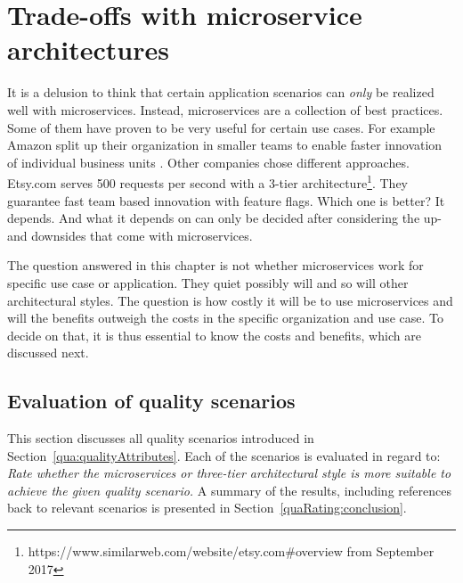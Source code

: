 \chapter{Trade-offs with microservice architectures}
\label{qua:qualitiesRating}


It is a delusion to think that certain application scenarios can \textit{only} be realized well with microservices.
Instead, microservices are a collection of best practices.
Some of them have proven to be very useful for certain use cases.
For example Amazon split up their organization in smaller teams to enable faster innovation of individual business units \cite{Vogels2006}.
Other companies chose different approaches.
Etsy.com serves 500 requests per second with a 3-tier architecture\footnote{https://www.similarweb.com/website/etsy.com\#overview from September 2017}.
They guarantee fast team based innovation with feature flags.
Which one is better?
It depends.
And what it depends on can only be decided after considering the up- and downsides that come with microservices.

The question answered in this chapter is not whether microservices work for specific use case or application.
They quiet possibly will and so will other architectural styles.
The question is how costly it will be to use microservices and will the benefits outweigh the costs in the specific organization and use case.
To decide on that, it is thus essential to know the costs and benefits, which are discussed next.

\section{Evaluation of quality scenarios}
\label{quaMicro:rating}

This section discusses all quality scenarios introduced in Section~\ref{qua:qualityAttributes}.
Each of the scenarios is evaluated in regard to:
\textit{Rate whether the microservices or three-tier architectural style is more suitable to achieve the given quality scenario.}
A summary of the results, including references back to relevant scenarios is presented in Section~\ref{quaRating:conclusion}.

